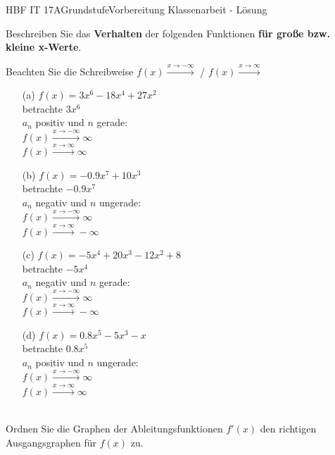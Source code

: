 \documentclass[oneside,openany,headings=optiontotoc,11pt,numbers=noenddot]{scrreprt}
\begin{document}
	\begin{worksheet}{HBF IT 17A}{Grundstufe}{Vorbereitung Klassenarbeit - Lösung}
		\begin{framed}
			\noindent\normalsize
			Beschreiben Sie das \textbf{Verhalten} der folgenden Funktionen \textbf{für große bzw. kleine x-Werte}.
			\begin{framed}
				Beachten Sie die Schreibweise \(f(x) \xrightarrow{x \rightarrow -\infty}\) / \(f(x) \xrightarrow{x \rightarrow \infty}\)
			\end{framed}
			\begin{itemize}
				\item[(a)] \(f(x) = 3x^6 -18x^4 +27x^2\)\\
				betrachte \(3x^6\)\\
				\(a_n\) positiv und \(n\) gerade:\\
				\(f(x) \xrightarrow{x \rightarrow -\infty} \infty\)\\
				\(f(x) \xrightarrow{x \rightarrow \infty} \infty\)
				\item[(b)] \(f(x) = -0.9x^7+10x^3\)\\
				betrachte \(-0.9x^7\)\\
				\(a_n\) negativ und \(n\) ungerade:\\
				\(f(x) \xrightarrow{x \rightarrow -\infty} \infty\)\\
				\(f(x) \xrightarrow{x \rightarrow \infty} -\infty\)
				\item[(c)] \(f(x) = -5x^4 +20x^3 -12x^2 +8\)\\
				betrachte \(-5x^4\)\\
				\(a_n\) negativ und \(n\) gerade:\\
				\(f(x) \xrightarrow{x \rightarrow -\infty} \infty\)\\
				\(f(x) \xrightarrow{x \rightarrow \infty} -\infty\)
				\item[(d)] \(f(x) = 0.8x^5-5x^3-x\)\\
				betrachte \(0.8x^5\)\\
				\(a_n\) positiv und \(n\) ungerade:\\
				\(f(x) \xrightarrow{x \rightarrow -\infty} \infty\)\\
				\(f(x) \xrightarrow{x \rightarrow \infty} \infty\)
			\end{itemize}
			\hdashrule[0.5ex][x]{\textwidth}{0.1mm}{8mm 2pt}\\
			\newpage
			Ordnen Sie die Graphen der Ableitungsfunktionen \(f'(x)\) den richtigen Ausgangsgraphen für \(f(x)\) zu.\\

\end{framed}
\end{worksheet}
\end{document}
